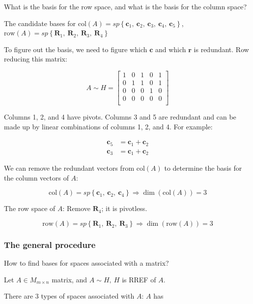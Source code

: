 \documentclass[12pt]{article}
\theoremstyle{plain}
\theoremstyle{remark}
\theoremstyle{definition}
\begin{document}
What is the basis for the row space, and what is the basis for the
column space?

The candidate bases for
\(\text{col}(A) = sp\left\{ {\mathbf{c}}_{1},\ {\mathbf{c}}_{2},\ {\mathbf{c}}_{3},\ {\mathbf{c}}_{4},\ {\mathbf{c}}_{5} \right\}\),
\(\text{row}(A) = sp\left\{ {\mathbf{R}}_{1},\ {\mathbf{R}}_{2},\ {\mathbf{R}}_{3},\ {\mathbf{R}}_{4} \right\}\)

To figure out the basis, we need to figure which \(\mathbf{c}\) and
which \(\mathbf{r}\) is redundant. Row reducing this matrix:

\[A\sim H = \begin{bmatrix}
1 & 0 & 1 & 0 & 1 \\
0 & 1 & 1 & 0 & 1 \\
0 & 0 & 0 & 1 & 0 \\
0 & 0 & 0 & 0 & 0 \\
\end{bmatrix}\]

Columns 1, 2, and 4 have pivots. Columns 3 and 5 are redundant and can
be made up by linear combinations of columns 1, 2, and 4. For example:

\begin{align*}
{\mathbf{c}}_{5} &= {\mathbf{c}}_{1} + {\mathbf{c}}_{2} \\
{\mathbf{c}}_{3} &= {\mathbf{c}}_{1} + {\mathbf{c}}_{2}
\end{align*}


We can remove the redundant vectors from \(\text{col}(A)\) to determine
the basis for the column vectors of \(A\):

\[\text{col}(A) = sp\left\{ {\mathbf{c}}_{1},\ {\mathbf{c}}_{2},\ {\mathbf{c}}_{4} \right\} \Rightarrow \dim\left( \text{col}(A) \right) = 3\]

The row space of \(A\): Remove \({\mathbf{R}}_{4}\); it is
pivotless.

\[\text{row}(A) = sp\left\{ {\mathbf{R}}_{1},\ {\mathbf{R}}_{2},\ {\mathbf{R}}_{3} \right\} \Rightarrow \dim\left( \text{row}(A) \right) = 3\]


\subsubsection{The general procedure}

How to find bases for spaces associated with a matrix?

Let \(A \in M_{m \times n}\) matrix, and \(A\sim H,\ H\) is RREF of
\(A\).

There are 3 types of spaces associated with \(A\): \(A\) has
\end{document}

